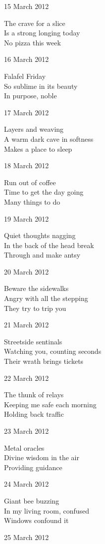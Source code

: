 \documentclass[12pt]{article}
\begin{document}
15 March 2012

The crave for a slice \\
Is a strong longing today \\
No pizza this week

16 March 2012

Falafel Friday \\
So sublime in its beauty \\
In purpose, noble

17 March 2012

Layers and weaving \\
A warm dark cave in softness \\
Makes a place to sleep

\newpage

18 March 2012

Run out of coffee \\
Time to get the day going \\
Many things to do

19 March 2012

Quiet thoughts nagging \\
In the back of the head break \\
Through and make antsy

20 March 2012

Beware the sidewalks \\
Angry with all the stepping \\
They try to trip you

21 March 2012

Streetside sentinals \\
Watching you, counting seconds \\
Their wrath brings tickets

22 March 2012

The thunk of relays \\
Keeping me safe each morning \\
Holding back traffic

23 March 2012

Metal oracles \\
Divine wisdom in the air \\
Providing guidance

24 March 2012

Giant bee buzzing \\
In my living room, confused \\
Windows confound it


\newpage

25 March 2012
\end{document}

